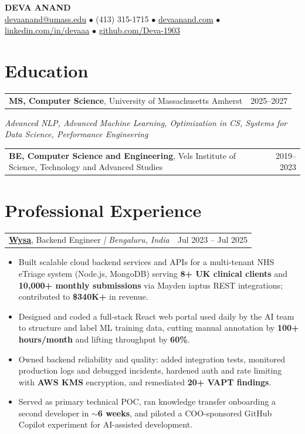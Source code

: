 \documentclass[letterpaper,11pt]{article}
\makeatletter
\newcommand{\eduItem}[3]{%
  \begin{tabular*}{\textwidth}{@{}l@{\extracolsep{\fill}}r@{}}
    \textbf{#1}, #2 & #3 \\
  \end{tabular*}\par
}
\newcommand{\expItem}[4]{%
  \vspace{3pt}
  \begin{tabular*}{\textwidth}{@{}l@{\extracolsep{\fill}}r@{}}
    \textbf{#1}, #2 \textit{| #3} & #4 \\
  \end{tabular*}\par\vspace{-2pt}
}
\makeatother
\begin{document}
\begin{center}
    {\fontsize{18}{20}\selectfont\bfseries DEVA ANAND}\\ \vspace{3pt}
    {\small
    \href{mailto:devaanand@umass.edu}{devaanand@umass.edu}
    \enspace$\bullet$\enspace
    (413) 315-1715
    \enspace$\bullet$\enspace
    \href{https://devaanand.com}{devaanand.com}
    \enspace$\bullet$\enspace
    \href{https://linkedin.com/in/devaaa/}{linkedin.com/in/devaaa}
    \enspace$\bullet$\enspace
    \href{https://github.com/Deva-1903}{github.com/Deva-1903}}
\end{center}
\vspace{-6pt}

\section{Education}
\eduItem{MS, Computer Science}{University of Massachusetts Amherst}{2025--2027}
{\small\textit{Advanced NLP, Advanced Machine Learning, Optimization in CS, Systems for Data Science, Performance Engineering}}\par
\vspace{3pt}
\eduItem{BE, Computer Science and Engineering}{Vels Institute of Science, Technology and Advanced Studies}{2019--2023}

\section{Professional Experience}

\expItem{\href{https://www.wysa.io}{Wysa}}{Backend Engineer}{Bengaluru, India}{Jul 2023 -- Jul 2025}
\begin{itemize}
  \item Built scalable cloud backend services and APIs for a multi-tenant NHS eTriage system (Node.js, MongoDB) serving \textbf{8+ UK clinical clients} and \textbf{10{,}000+ monthly submissions} via Mayden iaptus REST integrations; contributed to \textbf{\$340K+} in revenue.
  \item Designed and coded a full-stack React web portal used daily by the AI team to structure and label ML training data, cutting manual annotation by \textbf{100+ hours/month} and lifting throughput by \textbf{60\%}.
  \item Owned backend reliability and quality: added integration tests, monitored production logs and debugged incidents, hardened auth and rate limiting with \textbf{AWS KMS} encryption, and remediated \textbf{20+ VAPT findings}.
  \item Served as primary technical POC, ran knowledge transfer onboarding a second developer in \textbf{$\sim$6 weeks}, and piloted a COO-sponsored GitHub Copilot experiment for AI-assisted development.
\end{itemize}
\end{document}
